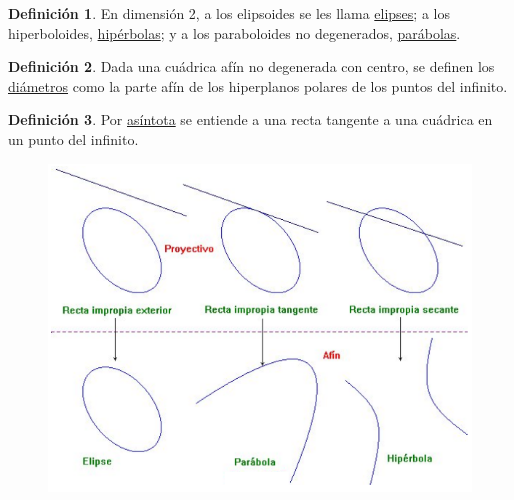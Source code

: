 \documentclass[12pt]{report}
\theoremstyle{definition}
\newtheorem{definition}{Definición}[chapter]
\theoremstyle{definition}
\theoremstyle{remark}
\begin{document}
\begin{definition}
En dimensión 2, a los elipsoides se les llama \ul{elipses}; a los hiperboloides, \ul{hipérbolas}; y a los paraboloides no degenerados, \ul{parábolas}.
\end{definition}

\begin{definition}
Dada una cuádrica afín no degenerada con centro, se definen los \ul{diámetros} como la parte afín de los hiperplanos polares de los puntos del infinito.
\end{definition}

\begin{definition}
Por \ul{asíntota} se entiende a una recta tangente a una cuádrica en un punto del infinito.
\end{definition}

\begin{figure}[h]
\includegraphics[scale = 0.5]{6.3_1}
\centering
\end{figure}
\end{document}
